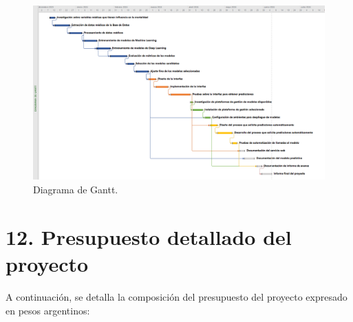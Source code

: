 \documentclass[
11pt, %
]{charter}
\begin{document}
\begin{landscape}
\begin{figure}[htpb]
\centering 
\includegraphics[height=.9\textheight]{./Figuras/Gantt-2.png}
\caption{Diagrama de Gantt.}
\label{fig:diagGantt02}
\end{figure}

\end{landscape}

\section{12. Presupuesto detallado del proyecto}
\label{sec:presupuesto}

A continuación, se detalla la composición del presupuesto del proyecto expresado en pesos argentinos:
\end{document}
